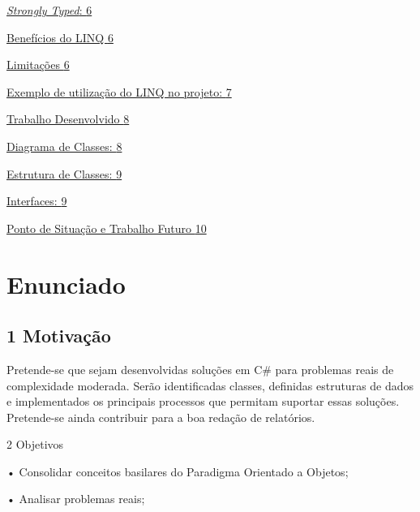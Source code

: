 \documentclass[
]{article}
\begin{document}
\protect\hyperlink{strongly-typed}{\emph{Strongly Typed}:
\protect\hyperlink{strongly-typed}{6}}

\protect\hyperlink{benefuxedcios-do-linq}{Benefícios do LINQ
\protect\hyperlink{benefuxedcios-do-linq}{6}}

\protect\hyperlink{limitauxe7uxf5es}{Limitações
\protect\hyperlink{limitauxe7uxf5es}{6}}

\protect\hyperlink{exemplo-de-utilizauxe7uxe3o-do-linq-no-projeto}{Exemplo
de utilização do LINQ no projeto:
\protect\hyperlink{exemplo-de-utilizauxe7uxe3o-do-linq-no-projeto}{7}}

\protect\hyperlink{trabalho-desenvolvido}{Trabalho Desenvolvido
\protect\hyperlink{trabalho-desenvolvido}{8}}

\protect\hyperlink{diagrama-de-classes}{Diagrama de Classes:
\protect\hyperlink{diagrama-de-classes}{8}}

\protect\hyperlink{estrutura-de-classes}{Estrutura de Classes:
\protect\hyperlink{estrutura-de-classes}{9}}

\protect\hyperlink{interfaces}{Interfaces:
\protect\hyperlink{interfaces}{9}}

\protect\hyperlink{ponto-de-situauxe7uxe3o-e-trabalho-futuro}{Ponto de
Situação e Trabalho Futuro
\protect\hyperlink{ponto-de-situauxe7uxe3o-e-trabalho-futuro}{10}}

\hypertarget{enunciado}{%
\section{\texorpdfstring{Enunciado }{Enunciado }}\label{enunciado}}

\hypertarget{motivauxe7uxe3o}{%
\subsection{\texorpdfstring{1 Motivação
}{1 Motivação }}\label{motivauxe7uxe3o}}

Pretende-se que sejam desenvolvidas soluções em C\# para problemas reais
de complexidade moderada. Serão identificadas classes, definidas
estruturas de dados e implementados os principais processos que permitam
suportar essas soluções. Pretende-se ainda contribuir para a boa redação
de relatórios.

\protect\hypertarget{_Toc182595576}{}{}2 Objetivos

• Consolidar conceitos basilares do Paradigma Orientado a Objetos;

• Analisar problemas reais;
\end{document}
